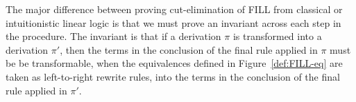 The major difference between proving cut-elimination of FILL from
classical or intuitionistic linear logic is that we must prove an
invariant across each step in the procedure.  The invariant is that if
a derivation $\pi$ is transformed into a derivation $\pi'$, then the
terms in the conclusion of the final rule applied in $\pi$ must be be
transformable, when the equivalences defined in
Figure~\ref{def:FILL-eq} are taken as left-to-right rewrite rules,
into the terms in the conclusion of the final rule applied in $\pi'$.


\begin{comment}
  
For example,
consider the following case in the cut-elimination procedure for FILL:

\ \\
\noindent
The proof
\begin{center}
  \scriptsize
  \begin{math}
    $$\mprset{flushleft}
    \inferrule* [right=\tiny Cut] {
      \inferrule* [right=] {
        \inferrule* [right=,vdots=1.5em,fraction=\,] {
          \,
        }{\pi_1}          
      }{[[G |- t : A | L]]}      
      \\
      $$\mprset{flushleft}
      \inferrule* [right=\tiny Parr] {
        \inferrule* [right=] {
        \inferrule* [right=,vdots=1.5em,fraction=\,] {
          \,
        }{\pi_2}          
      }{[[G1,x : A,G2 |- h(L1 | h(t1 : B | t2 : C)) | L2]]}                  
    }{[[G1,x : A,G2 |- h(L1 | h(t1 (+) t2 : B (+) C)) | L2]]}
  }{[[G1,G,G2 |- L | h(h(h([t/x]L1) | h([t/x]{t1 (+) t2} : B (+) C)) | [t/x]L2)]]}
  \end{math}
\end{center}
transforms into the proof
\begin{center}
  \scriptsize
  \begin{math}
    $$\mprset{flushleft}
\inferrule* [right=\tiny Parr] {
  $$\mprset{flushleft}
  \inferrule* [right=\tiny Cut] {
    \inferrule* [right=] {
        \inferrule* [right=,vdots=1.5em,fraction=\,] {
          \,
        }{\pi_1}          
      }{[[G |- t : A | L]]}      
      \\
      \inferrule* [right=] {
        \inferrule* [right=,vdots=1.5em,fraction=\,] {
          \,
        }{\pi_2}          
      }{[[G1,x : A,G2 |- h(L1 | h(t1 : B | t2 : C)) | L2]]}                  
    }{[[G1,G,G2 |- L | h(h(h([t/x]L1) | h(h{[t/x]t1} : B | h{[t/x]t2} : C)) | [t/x]L2)]]}
  }{[[G1,G,G2 |- L | h(h(h([t/x]L1) | h{[t/x]t1} (+) h{[t/x]t2} : B (+) C) | [t/x]L2)]]}
  \end{math}
\end{center}
Now we must show that $[[L]] = [[L]]$, $[[ [t/x]L1]] = [[ [t/x]L1]]$,
$[[ [t/x]{t1 (+) t2} = {[t/x]t1} (+) [t/x]t2]]$, and
$[[ [t/x]L2]] = [[ [t/x]L2]]$, but the only non-trivial case is
whether $[[ [t/x]{t1 (+) t2} = {[t/x]t1} (+) [t/x]t2]]$ holds, but
this clearly holds by a simple property of capture avoiding
substitution.  Every case of the cut-elimination procedure proceeds
just as this example does.
\end{comment}
